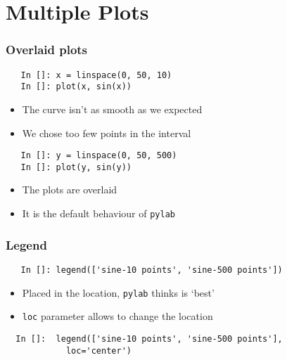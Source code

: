 \section{Multiple Plots}

\begin{frame}[fragile]
  \frametitle{Overlaid plots}
  \begin{lstlisting}
   In []: x = linspace(0, 50, 10)
   In []: plot(x, sin(x))
  \end{lstlisting}
  \begin{itemize}
  \item The curve isn't as smooth as we expected
  \item We chose too few points in the interval
  \end{itemize}
  \begin{lstlisting}
   In []: y = linspace(0, 50, 500)
   In []: plot(y, sin(y))
  \end{lstlisting}
  \begin{itemize}
  \item The plots are overlaid
  \item It is the default behaviour of \texttt{pylab}
  \end{itemize}
\end{frame}

\begin{frame}[fragile]
  \frametitle{Legend}
  \begin{lstlisting}
   In []: legend(['sine-10 points', 'sine-500 points'])
  \end{lstlisting}
  \begin{itemize}
  \item Placed in the location, \texttt{pylab} thinks is `best'
  \item \texttt{loc} parameter allows to change the location
  \end{itemize}
  \begin{lstlisting}
  In []:  legend(['sine-10 points', 'sine-500 points'], 
            loc='center')
  \end{lstlisting}
\end{frame}

